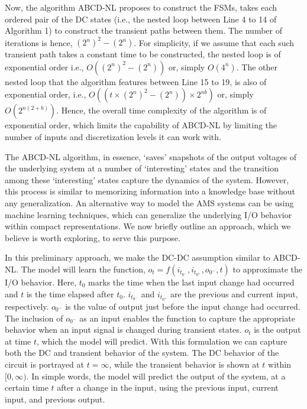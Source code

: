 \documentclass[a4paper]{article}
\begin{document}
Now, the algorithm ABCD-NL proposes to construct the FSMs, takes each ordered pair of the DC states (i.e., the nested loop between Line 4 to 14 of Algorithm 1) to construct the transient paths between them. The number of iterations is hence, $ (2^n)^2 - (2^n) $. For simplicity, if we assume that each such transient path takes a constant time to be constructed, the nested loop is of exponential order i.e., $O((2^n)^2 - (2^n))$ or, simply $O(4^n)$. The other nested loop that the algorithm features between Line 15 to 19, is also of exponential order, i.e., $O( (t \times (2^n)^2 - (2^n)) \times 2^{nb})$ or, simply $O(2^{n(2+b)})$. Hence, the overall time complexity of the algorithm is of exponential order, which limits the capability of ABCD-NL by limiting the number of inputs and discretization levels it can work with.

 

The ABCD-NL algorithm, in essence, `saves' snapshots of the output voltages of the underlying system at a number of `interesting' states and the transition among these `interesting' states capture the dynamics of the system. %
However, this process is similar to memorizing information into a knowledge base without any generalization. An alternative way to model the AMS systems can be using machine learning techniques, which can generalize the underlying I/O behavior within compact representations. We now briefly outline an approach, which we believe is worth exploring, to serve this purpose. 


In this preliminary approach, we make the DC-DC assumption similar to ABCD-NL. The model will learn the function, $o_t = f (i_{t_{0^-}}, i_{t_{0^+}}, o_{0^-}, t)$ to approximate the I/O behavior.
Here, $t_0$ marks the time when the last input change had occurred and $t$ is the time elapsed after $t_0$. $i_{t_{0^-}}$ and $i_{t_{0^+}}$ are the previous and current input, respectively. $o_{0^-}$ is the value of output just before the input change had occurred. The inclusion of $o_{0^-}$ as an input enables the function to capture the appropriate behavior when an input signal is changed during transient states. $o_t$ is the output at time $t$, which the model will predict. With this formulation we can capture both the DC and transient behavior of the system. The DC behavior of the circuit is portrayed at $t = \infty$, while the transient behavior is shown at $t$ within $[0, \infty)$. In simple words, the model will predict the output of the system, at a certain time $t$ after a change in the input, using the previous input, current input, and previous output. 
\end{document}
